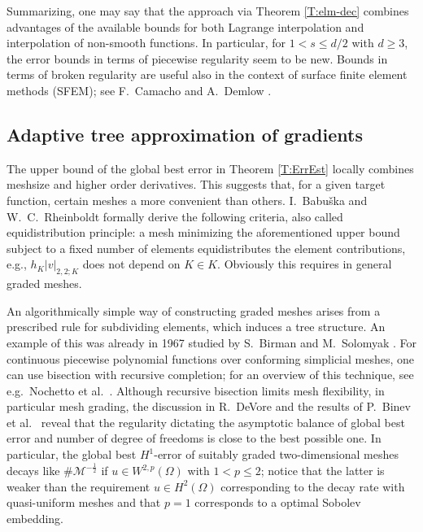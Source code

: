 \documentclass[a4paper]{amsart}
\numberwithin{equation}{section}
\theoremstyle{plain}
\theoremstyle{definition}
\begin{document}
Summarizing, one may say that the approach via Theorem \ref{T:elm-dec} 
combines advantages of the available bounds for both Lagrange interpolation and 
interpolation of non-smooth functions. In particular, for 
$1 < s \leq d/2$ with $d\geq3$, the error bounds in terms of piecewise 
regularity seem to be new.  Bounds in terms of broken regularity are useful 
also in the context of surface finite element methods (SFEM); see 
F.\ Camacho and A.\ Demlow \cite{Camacho.Demlow:P}.

\subsection{Adaptive tree approximation of gradients}
\label{S:tree-approx}
The upper bound of the global best error in Theorem \ref{T:ErrEst} locally 
combines meshsize and higher order derivatives.  This suggests that, for a 
given target function, certain meshes a more convenient than others.
I.\ Babu\v{s}ka and W.\ C.\ Rheinboldt \cite{Babuska.Rheinboldt:78a} formally 
derive the following criteria, also called equidistribution principle: a mesh 
minimizing the aforementioned upper bound subject to a fixed number of elements 
equidistributes the element contributions, e.g.,  $h_{K} 
{{\left|{{v}}\right|_{{{2},{2};{K}}}}}$ does not depend on $K\in{K}$.  Obviously this 
requires in general graded meshes.

An algorithmically simple way of constructing graded meshes arises from a 
prescribed rule for subdividing elements, which induces a tree structure.  An 
example of this was already in 1967 studied by S.\ Birman and M.\ Solomyak 
\cite{Birman.Solomyak:67}.  For continuous piecewise polynomial functions over 
conforming simplicial meshes, one can use bisection with recursive completion; 
for an overview of this technique, see e.g.\ Nochetto et al.\ 
\cite[\S4]{Nochetto.Siebert.Veeser:09}.  Although recursive bisection limits 
mesh flexibility, in particular mesh grading, the discussion in R.\ DeVore 
\cite[\S6]{DeVore:98} and the results of P.\ Binev et al.\ 
\cite{Binev.Dahmen.DeVore.Petrushev:02} reveal that the regularity dictating 
the asymptotic balance of global best error and number of degree of freedoms is 
close to the best possible one.  In particular, the global best $H^1$-error of 
suitably graded two-dimensional meshes decays like $\#{\mathcal{M}}^{-\frac12}$ if 
$u\in{W^{{2},{p}}}(\Omega)$ with $1<p\leq 2$; notice that the latter is weaker 
than the requirement $u\in{H^{2}}(\Omega)$ corresponding to the decay rate with 
quasi-uniform meshes and that $p=1$ corresponds to a optimal Sobolev embedding.
\end{document}
